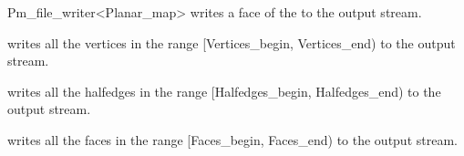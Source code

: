 \begin{ccRefClass}{Pm_file_writer<Planar_map>}
{writes a face of the  to the output stream.}

{writes all the vertices in the range [Vertices\_begin, Vertices\_end) to the output stream.}

{writes all the halfedges in the range [Halfedges\_begin, Halfedges\_end) to the output stream.}

{writes all the faces in the range [Faces\_begin, Faces\_end) to the output stream.}

\end{ccRefClass} %

\ccRefPageEnd











